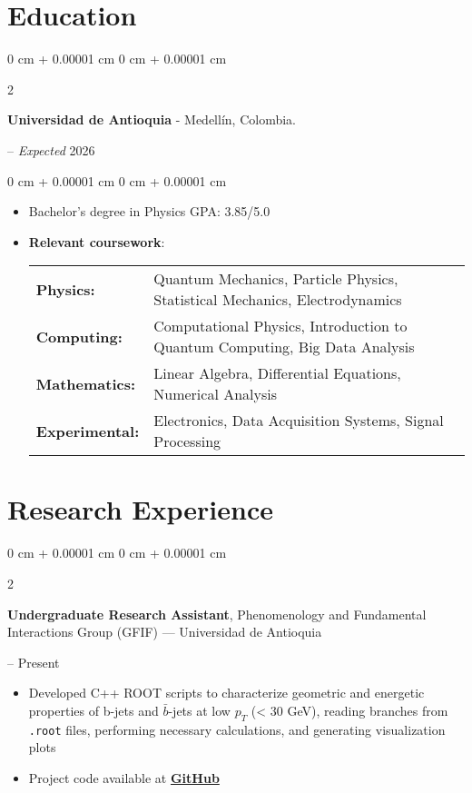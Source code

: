 \documentclass[10pt, letterpaper]{article}
\newenvironment{highlights}{
    \begin{itemize}[
        topsep=0.10 cm,
        parsep=0.10 cm,
        partopsep=0pt,
        itemsep=0pt,
        leftmargin=0 cm + 10pt
    ]
}{
    \end{itemize}
}
\newenvironment{onecolentry}{
    \begin{adjustwidth}{
        0 cm + 0.00001 cm
    }{
        0 cm + 0.00001 cm
    }
}{
    \end{adjustwidth}
}
\newenvironment{twocolentry}[2][]{
    \onecolentry
    \def\secondColumn{#2}
    \setcolumnwidth{\fill, 4.5 cm}
    \begin{paracol}{2}
}{
    \switchcolumn \raggedleft \secondColumn
    \end{paracol}
    \endonecolentry
}
\begin{document}
    \section{Education}
    \begin{twocolentry}{
        2019 – \textit{Expected} 2026
    }
        \textbf{Universidad de Antioquia} - Medellín, Colombia.
    \end{twocolentry}

    \vspace{0.10 cm}
    \begin{onecolentry}
        \begin{highlights}
            \item Bachelor’s degree in Physics \hfill GPA: 3.85/5.0
            \item \textbf{Relevant coursework}:  \begin{tabularx}{\textwidth}{@{}lX@{}}
        \textbf{Physics:} & Quantum Mechanics, Particle Physics, Statistical Mechanics, Electrodynamics \\
        \textbf{Computing:} & Computational Physics, Introduction to Quantum Computing, Big Data Analysis \\
        \textbf{Mathematics:} & Linear Algebra, Differential Equations, Numerical Analysis \\
        \textbf{Experimental:} & Electronics, Data Acquisition Systems, Signal Processing \\
    \end{tabularx}
        \end{highlights}
    \end{onecolentry}

    \section{Research Experience}
    \begin{twocolentry}{
        2024 – Present
    }
        \textbf{Undergraduate Research Assistant}, Phenomenology and Fundamental Interactions Group (GFIF) --- Universidad de Antioquia
    \end{twocolentry}
    \begin{highlights}
    \item Developed C++ ROOT scripts to characterize geometric and energetic properties of b-jets and \(\bar{b}\)-jets at low \(p_T\) (< 30 GeV), reading branches from \texttt{.root} files, performing necessary calculations, and generating visualization plots
    \item Project code available at \href{https://github.com/JuanJ27/Btagginghep}{\textbf{GitHub}}
    \end{highlights}
\end{document}
